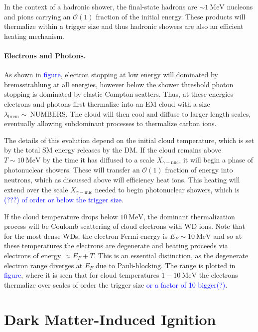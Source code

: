 \documentclass[twocolumn, preprintnumbers,amsmath,amssymb,prd, superscriptaddress]{revtex4}
\newcommand{\OO}{\mathcal{O}}
\newcommand{\MeV}{\text{MeV}}
\begin{document}
In the context of a hadronic shower, the final-state hadrons are $\sim1~\MeV$ nucleons and pions carrying an $\OO(1)$ fraction of the initial energy. 
These products will thermalize within a trigger size and thus hadronic showers are also an efficient heating mechanism.

\paragraph{Electrons and Photons.}
As shown in \textcolor{blue}{figure}, electron stopping at low energy will dominated by bremsstrahlung at all energies, however below the shower threshold photon stopping is dominated by elastic Compton scatters.
Thus, at these energies electrons and photons first thermalize into an EM cloud with a size $\lambda_\text{brem} \sim~\text{NUMBERS}$.
The cloud will then cool and diffuse to larger length scales, eventually allowing subdominant processes to thermalize carbon ions.

The details of this evolution depend on the initial cloud temperature, which is set by the total SM energy releases by the DM.
If the cloud remains above $T\sim10~\MeV$ by the time it has diffused to a scale $X_{\gamma-\text{nuc}}$, it will begin a phase of photonuclear showers.
These will transfer an $\OO(1)$ fraction of energy into neutrons, which as discussed above will efficiency heat ions.
This heating will extend over the scale $X_{\gamma-\text{nuc}}$ needed to begin photonuclear showers, which is \textcolor{blue}{(???) of order or below the trigger size}.

If the cloud temperature drops below $10~\MeV$, the dominant thermalization process will be Coulomb scattering of cloud electrons with WD ions.
Note that for the most dense WDs, the electron Fermi energy is $E_F \sim 10~\MeV$ and so at these temperatures the electrons are degenerate and heating proceeds via electrons of energy $\approx E_F + T$.
This is an essential distinction, as the degenerate electron range diverges at $E_F$ due to Pauli-blocking.
The range is plotted in \textcolor{blue}{figure}, where it is seen that for cloud temperatures $1-10~\MeV$ the electrons thermalize over scales of order the trigger size \textcolor{blue}{or a factor of 10 bigger(?)}.

\section{Dark Matter-Induced Ignition}
\label{sec:DMexplode}
\end{document}
